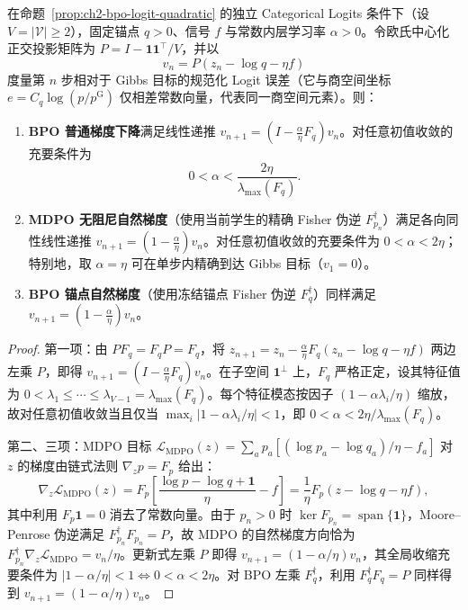 \documentclass[lang=cn,scheme=chinese,openany]{elegantbook}
\begin{document}
\begin{theorem}
\label{thm:ch2-inner-logit-step}
在命题~\ref{prop:ch2-bpo-logit-quadratic} 的独立 Categorical Logits 条件下（设 $V=|\mathcal V|\ge2$），固定锚点 $q>0$、信号 $f$ 与常数内层学习率 $\alpha>0$。令欧氏中心化正交投影矩阵为 $P=I-\mathbf1\mathbf1^\top/V$，并以
\begin{equation*}
 v_n=P(z_n-\log q-\eta f)
\end{equation*}
度量第 $n$ 步相对于 Gibbs 目标的规范化 Logit 误差（它与商空间坐标 $e=C_q\log(p/p^{\mathrm G})$ 仅相差常数向量，代表同一商空间元素）。则：
\begin{enumerate}
 \item \textbf{BPO 普通梯度下降}满足线性递推 $v_{n+1}=(I-\frac\alpha\eta F_q)v_n$。对任意初值收敛的充要条件为
 \begin{equation*}
 0<\alpha<\frac{2\eta}{\lambda_{\max}(F_q)}.
 \end{equation*}
 \item \textbf{MDPO 无阻尼自然梯度}（使用当前学生的精确 Fisher 伪逆 $F_{p_n}^\dagger$）满足各向同性线性递推 $v_{n+1}=(1-\frac\alpha\eta)v_n$。对任意初值收敛的充要条件为 $0<\alpha<2\eta$；特别地，取 $\alpha=\eta$ 可在单步内精确到达 Gibbs 目标（$v_1=0$）。
 \item \textbf{BPO 锚点自然梯度}（使用冻结锚点 Fisher 伪逆 $F_q^\dagger$）同样满足 $v_{n+1}=(1-\frac\alpha\eta)v_n$。
\end{enumerate}
\end{theorem}
\begin{proof}
第一项：由 $P F_q=F_q P=F_q$，将 $z_{n+1}=z_n-\frac\alpha\eta F_q(z_n-\log q-\eta f)$ 两边左乘 $P$，即得 $v_{n+1}=(I-\frac\alpha\eta F_q)v_n$。在子空间 $\mathbf1^\perp$ 上，$F_q$ 严格正定，设其特征值为 $0<\lambda_1\le\cdots\le\lambda_{V-1}=\lambda_{\max}(F_q)$。每个特征模态按因子 $(1-\alpha\lambda_i/\eta)$ 缩放，故对任意初值收敛当且仅当 $\max_i|1-\alpha\lambda_i/\eta|<1$，即 $0<\alpha<2\eta/\lambda_{\max}(F_q)$。

第二、三项：MDPO 目标 $\mathcal L_{\mathrm{MDPO}}(z)=\sum_a p_a[(\log p_a-\log q_a)/\eta-f_a]$ 对 $z$ 的梯度由链式法则 $\nabla_z p=F_p$ 给出：
\begin{equation*}
 \nabla_z\mathcal L_{\mathrm{MDPO}}(z)
 =F_p\left[\frac{\log p-\log q+\mathbf1}{\eta}-f\right]
 =\frac1\eta F_p(z-\log q-\eta f),
\end{equation*}
其中利用 $F_p\mathbf1=0$ 消去了常数向量。由于 $p_n>0$ 时 $\ker F_{p_n}=\operatorname{span}\{\mathbf1\}$，Moore--Penrose 伪逆满足 $F_{p_n}^\dagger F_{p_n}=P$，故 MDPO 的自然梯度方向恰为 $F_{p_n}^\dagger\nabla_z\mathcal L_{\mathrm{MDPO}}=v_n/\eta$。更新式左乘 $P$ 即得 $v_{n+1}=(1-\alpha/\eta)v_n$，其全局收缩充要条件为 $|1-\alpha/\eta|<1\Longleftrightarrow 0<\alpha<2\eta$。对 BPO 左乘 $F_q^\dagger$，利用 $F_q^\dagger F_q=P$ 同样得到 $v_{n+1}=(1-\alpha/\eta)v_n$。
\end{proof}
\end{document}
